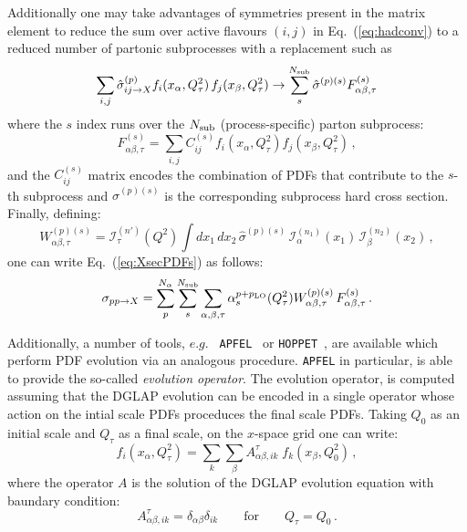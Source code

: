 \documentclass[preprint,12pt]{elsarticle}
\begin{document}
Additionally one may take advantages of symmetries present in the matrix element to reduce the sum over active flavours $(i,j)$ in
Eq.~(\ref{eq:hadconv}) to a reduced number of partonic subprocesses with a replacement such as
\begin{equation}
\sum_{i,j} \hat{\sigma}^{(p)}_{ij\to X}
f_i(x_\alpha,Q_\tau^2)\,f_j(x_\beta,Q_\tau^2)\rightarrow
\sum_{s}^{N_{\rm sub}} \hat{\sigma}^{(p)(s)} F^{(s)}_{\alpha\beta,\tau}
\end{equation}
where the $s$ index runs over the $N_{\rm sub}$ (process-specific)
parton subprocess:
\begin{equation}\label{eq:APPLsubproc}
  F^{(s)}_{\alpha\beta,\tau} =\sum_{i,j} C^{(s)}_{ij} 
  f_i(x_{\alpha},Q^2_\tau)f_j(x_{\beta},Q^2_\tau)\,,
\end{equation}
and the $C^{(s)}_{ij}$ matrix encodes the combination of PDFs that
contribute to the $s$-th subprocess and $\hat{\sigma}^{(p)(s)}$
is the corresponding subprocess hard cross section. Finally, defining:
\begin{equation}
  W_{\alpha\beta,\tau}^{(p)(s)} = \mathcal{I}_\tau^{(n')}(Q^2)\int dx_1\,dx_2\,
  \hat{\sigma}^{(p)(s)}\,\mathcal{I}_\alpha^{(n_1)}(x_1)
  \,\mathcal{I}_\beta^{(n_2)}(x_2)\,,
\end{equation}
one can write Eq.~(\ref{eq:XsecPDFs}) as follows:
\begin{equation} \label{eq:applconv}
  \sigma_{pp\to X} = \sum_p^{N_\alpha} \sum_{s}^{N_{\mathrm{sub}}} \sum_{\alpha,\beta,\tau} 
  \alpha_s^{p+p_{\rm LO}}(Q^2_\tau)W_{\alpha\beta,\tau}^{(p)(s)} \, F_{\alpha\beta,\tau}^{(s)}\,.
\end{equation}

Additionally, a number of tools, $e.g.$ {\tt
  APFEL}~\cite{Bertone:2013vaa} or {\tt HOPPET}~\cite{Salam:2008qg},
are available which perform PDF evolution via an analogous
procedure. {\tt APFEL} in particular, is able to provide the so-called
\textit{evolution operator}. The evolution operator, is computed
assuming that the DGLAP evolution can be encoded in a single operator
whose action on the intial scale PDFs proceduces the final scale
PDFs. Taking $Q_0$ as an initial scale and $Q_\tau$ as a final scale,
on the $x$-space grid one can write:
\begin{equation}\label{eq:fastPDFfinal_recalled}
  f_i(x_{\alpha},Q^2_\tau) = \sum_{k}
  \sum_\beta A^\tau_{\alpha\beta, ik}\;
  f_k(x_\beta,Q^2_0)\,, 
\end{equation}
where the operator $A$ is the solution of the DGLAP evolution
equation with baundary condition:
\begin{equation}
A^\tau_{\alpha\beta, ik} =
\delta_{\alpha\beta}\delta_{ik}\qquad\mbox{for}\qquad Q_\tau = Q_0\,.
\end{equation}
\end{document}
